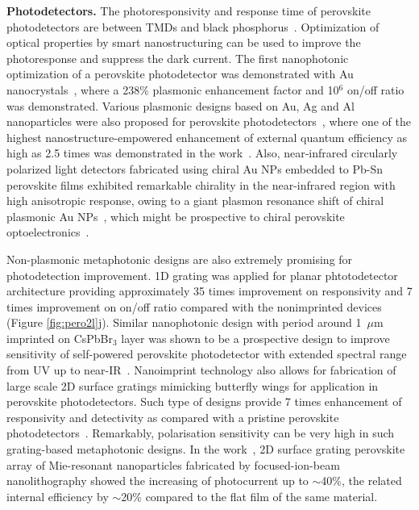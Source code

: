 \documentclass[journal=chreay,manuscript=review]{achemso}
\begin{document}
\textbf{Photodetectors.}
The photoresponsivity and response time of perovskite photodetectors are between TMDs and black phosphorus~\cite{wang2021recent}. Optimization of optical properties by smart nanostructuring can be used to improve the photoresponse and suppress the dark current. The first nanophotonic optimization of a perovskite photodetector was demonstrated with Au nanocrystals~\cite{dong2016improving}, where a 238\% plasmonic enhancement factor and 10$^6$ on/off ratio was demonstrated. Various plasmonic designs based on Au, Ag and Al nanoparticles were also proposed for perovskite photodetectors~\cite{sun2016plasmonic,wang2017plasmon,liu2019using,wang2018perovskite,li2018plasmonic, li2020enhanced, wang2020boosting}, where one of the highest nanostructure-empowered enhancement of external quantum efficiency as high as 2.5 times was demonstrated in the work~\cite{du2018plasmonic}. Also, near‐infrared circularly polarized light detectors fabricated using chiral Au NPs embedded to Pb-Sn perovskite films exhibited remarkable chirality in the near-infrared region with high anisotropic response, owing to a giant plasmon resonance shift of chiral plasmonic Au NPs~\cite{kim2022ultrasensitive}, which might be prospective to chiral perovskite optoelectronics~\cite{long2021all,long2020chiral}.

Non-plasmonic metaphotonic designs are also extremely promising for photodetection improvement. 1D grating was applied for planar phtotodetector architecture providing approximately 35 times improvement on responsivity and 7 times improvement on on/off ratio compared with the nonimprinted devices~\cite{wang2016nanoimprinted} (Figure \ref{fig:pero2l}j). Similar nanophotonic design with period around 1~$\mu$m imprinted on CsPbBr$_3$ layer was shown to be a prospective design to improve sensitivity of self-powered perovskite photodetector with extended spectral range from UV up to near-IR~\cite{cao2019self}. Nanoimprint technology also allows for fabrication of large scale 2D surface gratings mimicking butterfly wings for application in perovskite photodetectors. Such type of designs provide 7 times enhancement of responsivity and detectivity as compared with a pristine perovskite photodetectors~\cite{zhan2019butterfly}. Remarkably, polarisation sensitivity can be very high in such grating-based metaphotonic designs. In the work~\cite{jing2020hybrid}, 2D surface grating perovskite array of Mie-resonant nanoparticles fabricated by focused-ion-beam nanolithography showed the increasing of photocurrent up to $\sim$40\%, the related internal efficiency by $\sim$20\% compared to the flat film of the same material.
\end{document}
